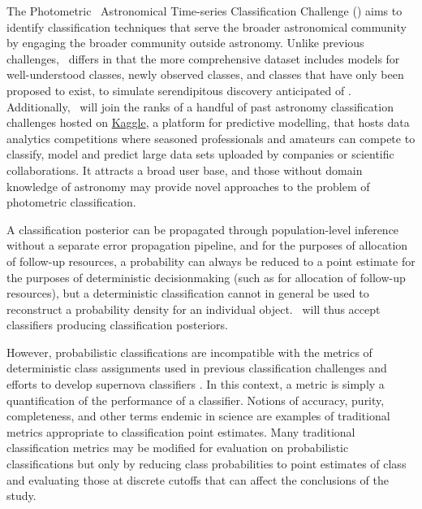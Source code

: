 The Photometric \lsst\ Astronomical Time-series Classification Challenge (\plasticc) aims to identify classification techniques that serve the broader astronomical community by engaging the broader community outside astronomy.
Unlike previous challenges, \plasticc\ differs in that the more comprehensive dataset includes models for well-understood classes, newly observed classes, and classes that have only been proposed to exist, to simulate serendipitous discovery anticipated of \lsst.
Additionally, \plasticc\ will join the ranks of a handful of past astronomy classification challenges hosted on \href{https://www.kaggle.com/competitions}{Kaggle}, a platform for predictive modelling, that hosts data analytics competitions where seasoned professionals and amateurs can compete to classify, model and predict large data sets uploaded by companies or scientific collaborations. It attracts a broad user base, and those without domain knowledge of astronomy may provide novel approaches to the problem of photometric classification.

A classification posterior can be propagated through population-level inference without a separate error propagation pipeline, and for the purposes of allocation of follow-up resources, a probability can always be reduced to a point estimate for the purposes of deterministic decisionmaking (such as for allocation of follow-up resources), but a deterministic classification cannot in general be used to reconstruct a probability density for an individual object.
\plasticc\ will thus accept classifiers producing classification posteriors.

However, probabilistic classifications are incompatible with the metrics of deterministic class assignments used in previous classification challenges \cite{kessler_supernova_2010, kessler_results_2010} and efforts to develop supernova classifiers \cite{2018ApJS..236....9N}.
In this context, a metric is simply a quantification of the performance of a classifier.
Notions of accuracy, purity, completeness, and other terms endemic in science are examples of traditional metrics appropriate to classification point estimates.
Many traditional classification metrics may be modified for evaluation on probabilistic classifications \cite{lochner_photometric_2016, moller_photometric_2016, hon_deep_2017, hon_detecting_2018, 2011arXiv1108.4696G} but only by reducing class probabilities to point estimates of class and evaluating those at discrete cutoffs that can affect the conclusions of the study.

